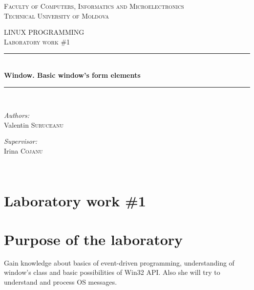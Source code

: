 \documentclass[12pt,a4paper,titlepage]{article}
\begin{document}
	
		\begin{center}
		
			\textsc{\large Faculty of Computers, Informatics and Microelectronics}\\[0.5cm]	
			\textsc{\large Technical University of Moldova}\\[1.2cm]
			\vspace{22mm}
			
			\textsc{\Large LINUX PROGRAMMING}\\[0.5cm]
			\textsc{\large Laboratory work \#1} \\[0.5cm]
			
			\newcommand{\KRule}{\rule{\linewidth}{0.5mm}}
			
			\vspace{10mm}
			\KRule \\[0.4cm]
			{\Large \bfseries Window. Basic window's form elements }\\[0.4cm]
			\KRule \\[1.5cm]
			
			\vspace{30mm}
			\begin{minipage}{0.4\textwidth}
				\begin{flushleft}
					\emph{Authors:}\\
					Valentin \textsc{Suruceanu}
				\end{flushleft}
			\end{minipage}
			\begin{minipage}{0.4\textwidth}
				\begin{flushright}
					\emph{Supervisor:}\\
					Irina \textsc{Cojanu}
				\end{flushright}
			\end{minipage}\\[4cm]
			\vspace{5mm}
			\vfill							
		\end{center}
	
	\pagebreak
	\newpage
	 	\section*{Laboratory work \#1}
	 	
		\section{Purpose of the laboratory}
		Gain knowledge about basics of event-driven programming, understanding of window’s class and basic possibilities of Win32 API. Also she will try to understand and process OS messages.
\end{document}
